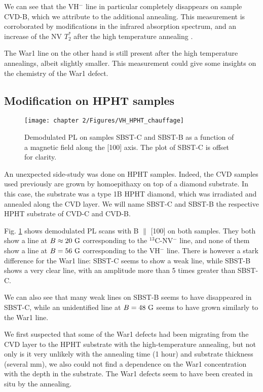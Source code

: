 \documentclass[a4paper, 11pt]{report}
\begin{document}
We can see that the VH$^-$ line in particular completely disappears on sample CVD-B, which we attribute to the additional annealing. This measurement is corroborated by modifications in the infrared absorption spectrum, and an increase of the NV $T_2^*$ after the high temperature annealing \citep{ngambou2022improving}.

The War1 line on the other hand is still present after the high temperature annealings, albeit slightly smaller. This measurement could give some insights on the chemistry of the War1 defect. %

\subsection{Modification on HPHT samples}

\begin{figure}[h]
\centering
\texttt{[image: chapter 2/Figures/VH\_HPHT\_chauffage]}
\caption{Demodulated PL on samples SBST-C and SBST-B as a function of a magnetic field along the [100] axis. The plot of SBST-C is offset for clarity.}
\label{chauffage HPHT}
\end{figure}

An unexpected side-study was done on HPHT samples. Indeed, the CVD samples used previously are grown by homoepithaxy on top of a diamond substrate. In this case, the substrate was a type 1B HPHT diamond, which was irradiated and annealed along the CVD layer. We will name SBST-C and SBST-B the respective HPHT substrate of CVD-C and CVD-B.

Fig. \ref{chauffage HPHT} shows demodulated PL scans with B $\parallel$ [100] on both samples. They both show a line at $B \approx 20\ \rm G$ corresponding to the $^{13}$C-NV$^-$ line, and none of them show a line at $B = 56\ \rm G$ corresponding to the VH$^-$ line. There is however a stark difference for the War1 line: SBST-C seems to show a weak line, while SBST-B shows a very clear line, with an amplitude more than 5 times greater than SBST-C. 

We can also see that many weak lines on SBST-B seems to have disappeared in SBST-C, while an unidentified line at $B = 48\ \rm G$ seems to have grown similarly to the War1 line.

We first suspected that some of the War1 defects had been migrating from the CVD layer to the HPHT substrate with the high-temperature annealing, but not only is it very unlikely with the annealing time (1 hour) and substrate thickness (several mm), we also could not find a dependence on the War1 concentration with the depth in the substrate. The War1 defects seem to have been created in situ by the annealing.
\end{document}
